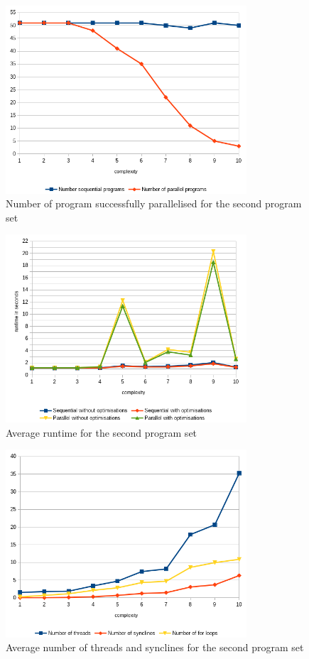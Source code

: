 \begin{figure}
    \centering
    \includegraphics[width=0.8\textwidth]{img/generated/par-success-2.png}
    \caption{\label{fig:gen-par-success-2}Number of program successfully parallelised for the second program set}
\end{figure}
\begin{figure}
    \centering
    \includegraphics[width=0.8\textwidth]{img/generated/avg-runtime-2.png}
    \caption{\label{fig:gen-avg-runtime-2}Average runtime for the second program set}
\end{figure}
\begin{figure}
    \centering
    \includegraphics[width=0.8\textwidth]{img/generated/thread-count-2.png}
    \caption{\label{fig:gen-thread-count-2}Average number of threads and synclines for the second program set}
\end{figure}


